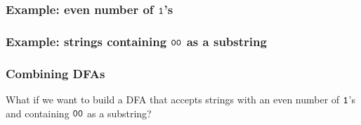 \begin{frame}
  \frametitle{Example: even number of ${\mathtt 1}$'s}
\end{frame}

\begin{frame}
  \frametitle{Example: strings containing ${\mathtt 0}{\mathtt 0}$ as a substring}
\end{frame}

\begin{frame}
  \frametitle{Combining DFAs}

  What if we want to build a DFA that accepts strings with an even
  number of ${\mathtt 1}$'s and containing ${\mathtt 0}{\mathtt 0}$ as a substring?

  \vspace{2in}
\end{frame}
